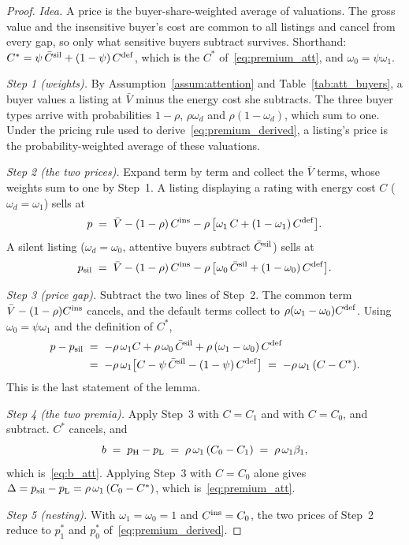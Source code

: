 \begin{proof}\upshape
\emph{Idea.} A price is the buyer-share-weighted average of valuations. The gross value and the insensitive buyer's cost are common to all listings and cancel from every gap, so only what sensitive buyers subtract survives. Shorthand: $C^*=\psi\,\bar C^{\rm sil}+(1-\psi)\,C^{\rm def}$, which is the $C^*$ of~\eqref{eq:premium_att}, and $\omega_0=\psi\omega_1$.

\emph{Step 1 (weights).} By Assumption~\ref{assum:attention} and Table~\ref{tab:att_buyers}, a buyer values a listing at $\bar V$ minus the energy cost she subtracts. The three buyer types arrive with probabilities $1-\rho$, $\rho\omega_d$ and $\rho(1-\omega_d)$, which sum to one. Under the pricing rule used to derive~\eqref{eq:premium_derived}, a listing's price is the probability-weighted average of these valuations.

\emph{Step 2 (the two prices).} Expand term by term and collect the $\bar V$ terms, whose weights sum to one by Step~1. A listing displaying a rating with energy cost $C$ ($\omega_d=\omega_1$) sells at
\begin{equation*}
    p\;=\;\bar V-(1-\rho)\,C^{\rm ins}-\rho\,\big[\omega_1\,C+(1-\omega_1)\,C^{\rm def}\big].
\end{equation*}
A silent listing ($\omega_d=\omega_0$, attentive buyers subtract $\bar C^{\rm sil}$) sells at
\begin{equation*}
    p_{\rm sil}\;=\;\bar V-(1-\rho)\,C^{\rm ins}-\rho\,\big[\omega_0\,\bar C^{\rm sil}+(1-\omega_0)\,C^{\rm def}\big].
\end{equation*}

\emph{Step 3 (price gap).} Subtract the two lines of Step~2. The common term $\bar V-(1-\rho)C^{\rm ins}$ cancels, and the default terms collect to $\rho(\omega_1-\omega_0)C^{\rm def}$. Using $\omega_0=\psi\omega_1$ and the definition of $C^*$,
\begin{align*}
    p-p_{\rm sil}
    &\;=\;-\rho\,\omega_1C+\rho\,\omega_0\,\bar C^{\rm sil}+\rho\,(\omega_1-\omega_0)\,C^{\rm def}\\
    &\;=\;-\rho\,\omega_1\big[C-\psi\,\bar C^{\rm sil}-(1-\psi)\,C^{\rm def}\big]\;=\;-\rho\,\omega_1\,(C-C^*).
\end{align*}
This is the last statement of the lemma.

\emph{Step 4 (the two premia).} Apply Step~3 with $C=C_1$ and with $C=C_0$, and subtract. $C^*$ cancels, and
\begin{equation*}
    b\;=\;p_{\rm H}-p_{\rm L}\;=\;\rho\,\omega_1\,(C_0-C_1)\;=\;\rho\,\omega_1\beta_1,
\end{equation*}
which is~\eqref{eq:b_att}. Applying Step~3 with $C=C_0$ alone gives $\Delta=p_{\rm sil}-p_{\rm L}=\rho\,\omega_1\,(C_0-C^*)$, which is~\eqref{eq:premium_att}.

\emph{Step 5 (nesting).} With $\omega_1=\omega_0=1$ and $C^{\rm ins}=C_0$, the two prices of Step~2 reduce to $p_1^*$ and $p_0^*$ of~\eqref{eq:premium_derived}.
\end{proof}

